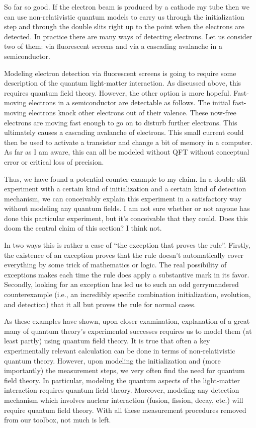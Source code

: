 \documentclass[12pt,prd,superscriptaddress,floatfix,amsmath,amssymb,amsfonts,nofootinbib]{revtex4-2}
\begin{document}
So far so good. If the electron beam is produced by a cathode ray tube then we can use non-relativistic quantum models to carry us through the initialization step and through the double slits right up to the point when the electrons are detected. In practice there are many ways of detecting electrons. Let us consider two of them: via fluorescent screens and via a cascading avalanche in a semiconductor. 

Modeling electron detection via fluorescent screens is going to require some description of the quantum light-matter interaction. As discussed above, this requires quantum field theory. However, the other option is more hopeful. Fast-moving electrons in a semiconductor are detectable as follows. The initial fast-moving electrons knock other electrons out of their valence. These now-free electrons are moving fast enough to go on to disturb further electrons. This ultimately causes a cascading avalanche of electrons. This small current could then be used to activate a transistor and change a bit of memory in a computer. As far as I am aware, this can all be modeled without QFT without conceptual error or critical loss of precision.

Thus, we have found a potential counter example to my claim. In a double slit experiment with a certain kind of initialization and a certain kind of detection mechanism, we can conceivably explain this experiment in a satisfactory way without modeling any quantum fields. I am not sure whether or not anyone has done this particular experiment, but it's conceivable that they could. Does this doom the central claim of this section? I think not. 

In two ways this is rather a case of ``the exception that proves the rule''. Firstly, the existence of an exception proves that the rule doesn't automatically cover everything by some trick of mathematics or logic. The real possibility of exceptions makes each time the rule does apply a substantive mark in its favor. Secondly, looking for an exception has led us to such an odd gerrymandered counterexample (i.e., an incredibly specific combination initialization, evolution, and detection) that it all but proves the rule for normal cases.

\vspace{0.5cm}
As these examples have shown, upon closer examination, explanation of a great many of quantum theory's experimental successes requires us to model them (at least partly) using quantum field theory. It is true that often a key experimentally relevant calculation can be done in terms of non-relativistic quantum theory. However, upon modeling the initialization and (more importantly) the measurement steps, we very often find the need for quantum field theory. In particular, modeling the quantum aspects of the light-matter interaction requires quantum field theory. Moreover, modeling any detection mechanism which involves nuclear interaction (fusion, fission, decay, etc.) will require quantum field theory. With all these measurement procedures removed from our toolbox, not much is left. 
\end{document}
